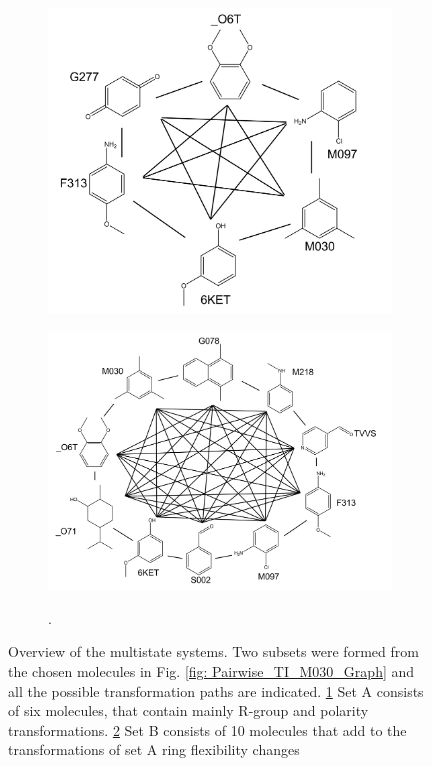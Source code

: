 \begin{figure}[h]
    \centering
    \begin{subfigure}{0.40\columnwidth}
        \includegraphics[width=\textwidth]{fig/methods/StateGraph_Multistate_easy6_2D.png}
        \caption{}
        \label{fig: multistate_6LigandsGraph}
    \end{subfigure}
    \begin{subfigure}{0.55\columnwidth}
        \includegraphics[width=\textwidth]{fig/methods/10state_flat_graph_2D.png}
        \caption{}
        \label{fig: multistate_10LigandsGraph}.
    \end{subfigure}
    \caption{Overview of the multistate systems. Two subsets were formed from the chosen molecules in Fig. \ref{fig: Pairwise_TI_M030_Graph} and all the possible transformation paths are indicated. \ref{fig: multistate_6LigandsGraph} Set A consists of six molecules, that contain mainly R-group and polarity transformations. \ref{fig: multistate_10LigandsGraph} Set B consists of 10 molecules that add to the transformations of set A ring flexibility changes}
    \label{fig: Subsets}
\end{figure}

